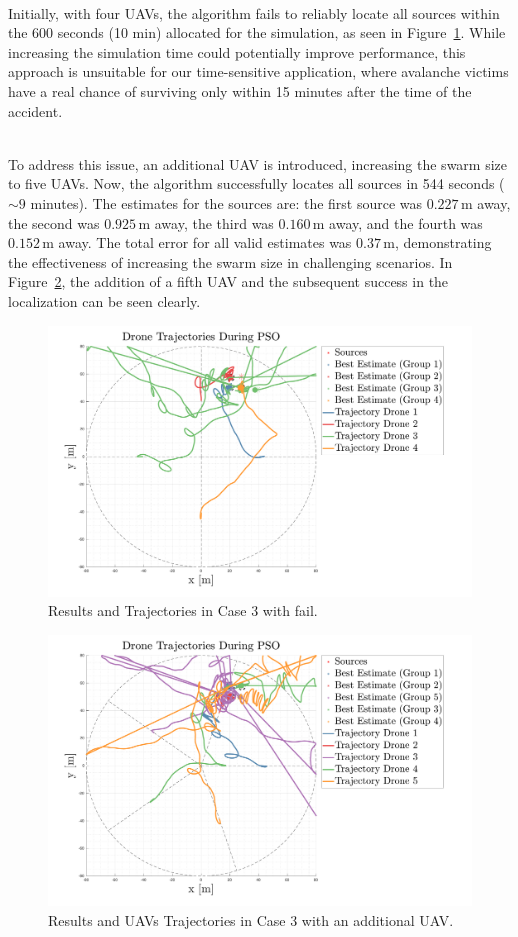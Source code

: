 \documentclass[main]{subfiles}
\begin{document}
\noindent\\
Initially, with four UAVs, the algorithm fails to reliably 
locate all sources within the 600 seconds (10 min) allocated for the simulation,
as seen in Figure~\ref{fig:case3fail}. 
While increasing the simulation time could potentially improve performance, 
this approach is unsuitable for our time-sensitive application, where
avalanche victims have a real chance of surviving only within 15 minutes
after the time of the accident.

\noindent\\
To address this issue, an additional UAV is introduced, increasing the 
swarm size to five UAVs. Now, the algorithm successfully 
locates all sources in 544 seconds (\(\sim 9\) minutes). 
The estimates for the sources are: the first source was \(0.227 \, \text{m}\) away, 
the second was \(0.925 \, \text{m}\) away, the third was \(0.160 \, \text{m}\) away, and the 
fourth was \(0.152 \, \text{m}\) away. The total error for all valid estimates was 
\(0.37 \, \text{m}\), demonstrating the effectiveness of increasing the 
swarm size in challenging scenarios.
In Figure~\ref{fig:case3}, the addition of a fifth UAV and the subsequent 
success in the localization can be seen clearly.

\begin{figure}
    \centering
    \includegraphics[width=1.06\textwidth]{images/case_3_fail.pdf}
    \caption[PSO Case 3]{Results and Trajectories in Case 3 with fail.}
    \label{fig:case3fail}
\end{figure}



\begin{figure}
    \centering
    \includegraphics[width=1.06\textwidth]{images/case_3.pdf}
    \caption[PSO Case 3]{Results and UAVs Trajectories in Case 3 with an additional UAV.}
    \label{fig:case3}
\end{figure}
\end{document}
